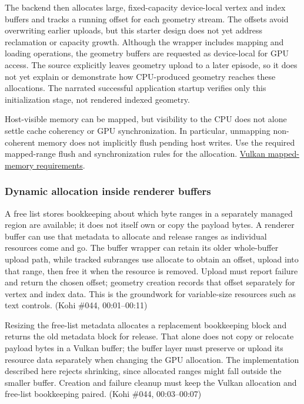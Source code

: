 The backend then allocates large, fixed-capacity device-local vertex and index buffers and tracks a running offset for each geometry stream. The offsets avoid overwriting earlier uploads, but this starter design does not yet address reclamation or capacity growth. Although the wrapper includes mapping and loading operations, the geometry buffers are requested as device-local for GPU access. The source explicitly leaves geometry upload to a later episode, so it does not yet explain or demonstrate how CPU-produced geometry reaches these allocations. The narrated successful application startup verifies only this initialization stage, not rendered indexed geometry.

Host-visible memory can be mapped, but visibility to the CPU does not alone settle cache coherency or GPU synchronization. In particular, unmapping non-coherent memory does not implicitly flush pending host writes. Use the required mapped-range flush and synchronization rules for the allocation. \href{https://docs.vulkan.org/refpages/latest/refpages/source/vkFlushMappedMemoryRanges.html}{Vulkan mapped-memory requirements}.

\subsubsection{Dynamic allocation inside renderer buffers}\label{06-engine-ii-ch025-dynamic-allocation-inside-renderer-buffers}

A free list stores bookkeeping about which byte ranges in a separately managed region are available; it does not itself own or copy the payload bytes. A renderer buffer can use that metadata to allocate and release ranges as individual resources come and go. The buffer wrapper can retain its older whole-buffer upload path, while tracked subranges use allocate to obtain an offset, upload into that range, then free it when the resource is removed. Upload must report failure and return the chosen offset; geometry creation records that offset separately for vertex and index data. This is the groundwork for variable-size resources such as text controls. (Kohi \#044, 00:01--00:11)

Resizing the free-list metadata allocates a replacement bookkeeping block and returns the old metadata block for release. That alone does not copy or relocate payload bytes in a Vulkan buffer; the buffer layer must preserve or upload its resource data separately when changing the GPU allocation. The implementation described here rejects shrinking, since allocated ranges might fall outside the smaller buffer. Creation and failure cleanup must keep the Vulkan allocation and free-list bookkeeping paired. (Kohi \#044, 00:03--00:07)

